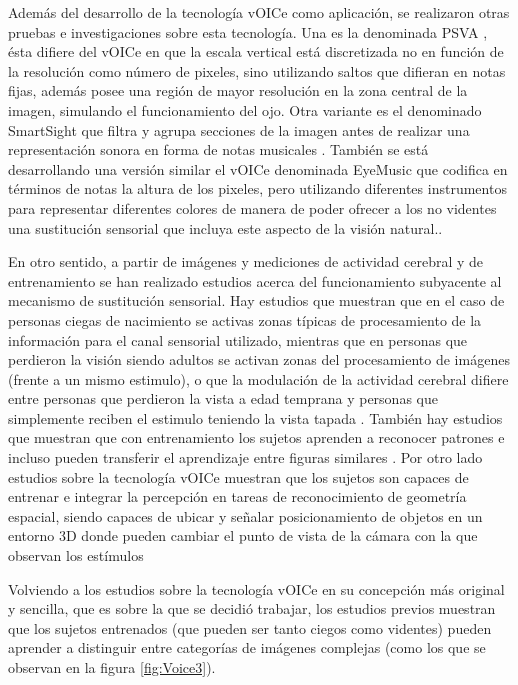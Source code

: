 \documentclass{article}
\numberwithin{figure}{section}
\begin{document}
    Además del desarrollo de la tecnología vOICe como aplicación, se realizaron otras pruebas e investigaciones sobre esta tecnología. Una es la denominada PSVA \cite{VoiceVariante1}, ésta difiere del vOICe en que la escala vertical está discretizada no en función de la resolución como número de pixeles, sino utilizando saltos que difieran en notas fijas, además posee una región de mayor resolución en la zona central de la imagen, simulando el funcionamiento del ojo. Otra variante es el denominado SmartSight que filtra y agrupa secciones de la imagen antes de realizar una representación sonora en forma de notas musicales \cite{VoiceVariantes2, VoiceVariantes3}. También se está desarrollando una versión similar el vOICe denominada EyeMusic que codifica en términos de notas la altura de los pixeles, pero utilizando diferentes instrumentos para representar diferentes colores de manera de poder ofrecer a los no videntes una sustitución sensorial que incluya este aspecto de la visión natural.\cite{VoiceVariantes4}.
    
    En otro sentido, a partir de imágenes y mediciones de actividad cerebral y de entrenamiento se han realizado estudios acerca del funcionamiento subyacente al mecanismo de sustitución sensorial. Hay estudios que muestran que en el caso de personas ciegas de nacimiento se activas zonas típicas de procesamiento de la información para el canal sensorial utilizado, mientras que en personas que perdieron la visión siendo adultos se activan zonas del procesamiento de imágenes (frente a un mismo estimulo), o que la modulación de la actividad cerebral difiere entre personas que perdieron la vista a edad temprana y personas que simplemente reciben el estimulo teniendo la vista tapada \cite{VoiceSubyacente1,VoiceSubyacente3}. También hay estudios que muestran que con entrenamiento los sujetos aprenden a reconocer patrones e incluso pueden transferir el aprendizaje entre figuras similares \cite{VoiceSubyacente2}. Por otro lado estudios sobre la tecnología vOICe muestran que los sujetos son capaces de entrenar e integrar la percepción en tareas de reconocimiento de geometría espacial, siendo capaces de ubicar y señalar posicionamiento de objetos en un entorno 3D donde pueden cambiar el punto de vista de la cámara con la que observan los estímulos \cite{VoiceSubyacente4}
    
    Volviendo a los estudios sobre la tecnología vOICe en su concepción más original y sencilla, que es sobre la que se decidió trabajar, los estudios previos muestran que los sujetos entrenados (que pueden ser tanto ciegos como videntes\cite{VoiceEntrenamiento1}) pueden aprender a distinguir entre categorías de imágenes complejas \cite{VoiceEntrenamiento2} (como los que se observan en la figura \ref{fig:Voice3}). 
    
\end{document}
